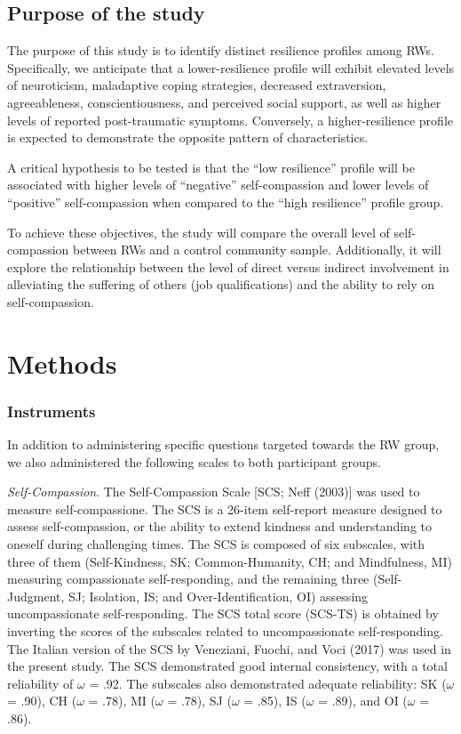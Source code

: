 \documentclass[
  man]{apa6}
\begin{document}
\hypertarget{purpose-of-the-study}{%
\subsection{Purpose of the study}\label{purpose-of-the-study}}

The purpose of this study is to identify distinct resilience profiles among RWs. Specifically, we anticipate that a lower-resilience profile will exhibit elevated levels of neuroticism, maladaptive coping strategies, decreased extraversion, agreeableness, conscientiousness, and perceived social support, as well as higher levels of reported post-traumatic symptoms. Conversely, a higher-resilience profile is expected to demonstrate the opposite pattern of characteristics.

A critical hypothesis to be tested is that the ``low resilience'' profile will be associated with higher levels of ``negative'' self-compassion and lower levels of ``positive'' self-compassion when compared to the ``high resilience'' profile group.

To achieve these objectives, the study will compare the overall level of self-compassion between RWs and a control community sample. Additionally, it will explore the relationship between the level of direct versus indirect involvement in alleviating the suffering of others (job qualifications) and the ability to rely on self-compassion.

\hypertarget{methods}{%
\section{Methods}\label{methods}}

\hypertarget{instruments}{%
\subsubsection{Instruments}\label{instruments}}

In addition to administering specific questions targeted towards the RW group, we also administered the following scales to both participant groups.

\emph{Self-Compassion}. The Self-Compassion Scale {[}SCS; Neff (2003){]} was used to measure self-compassione. The SCS is a 26-item self-report measure designed to assess self-compassion, or the ability to extend kindness and understanding to oneself during challenging times. The SCS is composed of six subscales, with three of them (Self-Kindness, SK; Common-Humanity, CH; and Mindfulness, MI) measuring compassionate self-responding, and the remaining three (Self-Judgment, SJ; Isolation, IS; and Over-Identification, OI) assessing uncompassionate self-responding. The SCS total score (SCS-TS) is obtained by inverting the scores of the subscales related to uncompassionate self-responding. The Italian version of the SCS by Veneziani, Fuochi, and Voci (2017) was used in the present study. The SCS demonstrated good internal consistency, with a total reliability of \(\omega\) = .92. The subscales also demonstrated adequate reliability: SK (\(\omega\) = .90), CH (\(\omega\) = .78), MI (\(\omega\) = .78), SJ (\(\omega\) = .85), IS (\(\omega\) = .89), and OI (\(\omega\) = .86).
\end{document}
